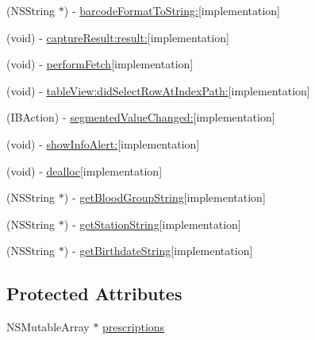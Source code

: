 \begin{DoxyCompactItemize}
\item 
(N\+S\+String $\ast$) -\/ \hyperlink{interface_patient_view_controller_a11f629dfcb05d614948e6a22a9b62609}{barcode\+Format\+To\+String\+:}{\ttfamily  \mbox{[}implementation\mbox{]}}
\item 
(void) -\/ \hyperlink{interface_patient_view_controller_ab0d5b631e4984e8800de2614b454f6e0}{capture\+Result\+:result\+:}{\ttfamily  \mbox{[}implementation\mbox{]}}
\item 
(void) -\/ \hyperlink{interface_patient_view_controller_a8cffe8050d49d33694655744748a830c}{perform\+Fetch}{\ttfamily  \mbox{[}implementation\mbox{]}}
\item 
(void) -\/ \hyperlink{interface_patient_view_controller_a5ed17bea4cad883582bc8bf280e08d59}{table\+View\+:did\+Select\+Row\+At\+Index\+Path\+:}{\ttfamily  \mbox{[}implementation\mbox{]}}
\item 
(I\+B\+Action) -\/ \hyperlink{interface_patient_view_controller_ac4977d46c2378db860bab95582a89894}{segmented\+Value\+Changed\+:}{\ttfamily  \mbox{[}implementation\mbox{]}}
\item 
(void) -\/ \hyperlink{interface_patient_view_controller_a733086f669eb38061d7095742689e013}{show\+Info\+Alert\+:}{\ttfamily  \mbox{[}implementation\mbox{]}}
\item 
(void) -\/ \hyperlink{interface_patient_view_controller_ac5a2964da1dd5c8fe84d38c28846622c}{dealloc}{\ttfamily  \mbox{[}implementation\mbox{]}}
\item 
(N\+S\+String $\ast$) -\/ \hyperlink{interface_patient_view_controller_a25c12bd39732f6874a96e4d44f49b65e}{get\+Blood\+Group\+String}{\ttfamily  \mbox{[}implementation\mbox{]}}
\item 
(N\+S\+String $\ast$) -\/ \hyperlink{interface_patient_view_controller_a735c33ed351ce545b7ef752b678d701d}{get\+Station\+String}{\ttfamily  \mbox{[}implementation\mbox{]}}
\item 
(N\+S\+String $\ast$) -\/ \hyperlink{interface_patient_view_controller_a820ee166c056d50a5642319be75137c5}{get\+Birthdate\+String}{\ttfamily  \mbox{[}implementation\mbox{]}}
\end{DoxyCompactItemize}
\subsection*{Protected Attributes}
\begin{DoxyCompactItemize}
\item 
N\+S\+Mutable\+Array $\ast$ \hyperlink{interface_patient_view_controller_a342561bab92448e254982cc47cb519d8}{prescriptions}
\end{DoxyCompactItemize}
